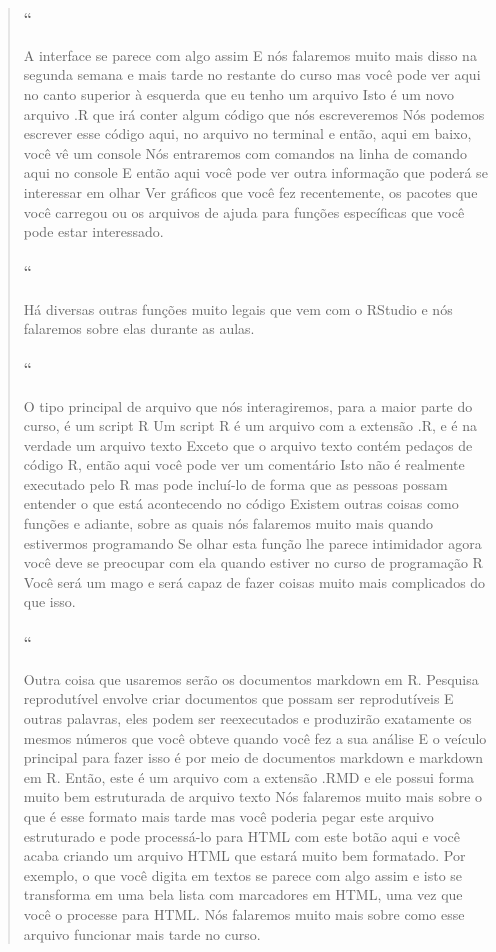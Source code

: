 \begin{quotation}
\begin{small}
\paragraph{``}
A interface se parece com algo assim E nós falaremos muito mais disso na segunda semana e mais tarde no restante do curso mas você pode ver aqui no canto superior à esquerda que eu tenho um arquivo Isto é um novo arquivo .R que irá conter algum código que nós escreveremos Nós podemos escrever esse código aqui, no arquivo no terminal e então, aqui em baixo, você vê um console Nós entraremos com comandos na linha de comando aqui no console E então aqui você pode ver outra informação que poderá se interessar em olhar Ver gráficos que você fez recentemente, os pacotes que você carregou ou os arquivos de ajuda para funções específicas que você pode estar interessado.

\paragraph{``}
Há diversas outras funções muito legais que vem com o RStudio e nós falaremos sobre elas durante as aulas.

\paragraph{``}
O tipo principal de arquivo que nós interagiremos, para a maior parte do curso, é um script R Um script R é um arquivo com a extensão .R, e é na verdade um arquivo texto Exceto que o arquivo texto contém pedaços de código R, então aqui você pode ver um comentário Isto não é realmente executado pelo R mas pode incluí-lo de forma que as pessoas possam entender o que está acontecendo no código Existem outras coisas como funções e adiante, sobre as quais nós falaremos muito mais quando estivermos programando Se olhar esta função lhe parece intimidador agora você deve se preocupar com ela quando estiver no curso de programação R Você será um mago e será capaz de fazer coisas muito mais complicados do que isso.

\paragraph{``}
Outra coisa que usaremos serão os documentos markdown em R. Pesquisa reprodutível envolve criar documentos que possam ser reprodutíveis E outras palavras, eles podem ser reexecutados e produzirão exatamente os mesmos números que você obteve quando você fez a sua análise E o veículo principal para fazer isso é por meio de documentos markdown e markdown em R. Então, este é um arquivo com a extensão .RMD e ele possui forma muito bem estruturada de arquivo texto Nós falaremos muito mais sobre o que é esse formato mais tarde mas você poderia pegar este arquivo estruturado e pode processá-lo para HTML com este botão aqui e você acaba criando um arquivo HTML que estará muito bem formatado. Por exemplo, o que você digita em textos se parece com algo assim e isto se transforma em uma bela lista com marcadores em HTML, uma vez que você o processe para HTML. Nós falaremos muito mais sobre como esse arquivo funcionar mais tarde no curso.


\end{small}
\end{quotation}
